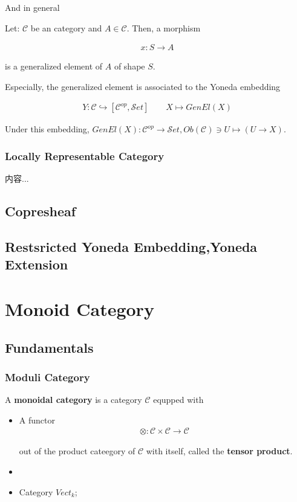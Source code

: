 \documentclass[Total.tex]{subfiles}
\begin{document}
		And in general
		
		\begin{Def}
			\label{Category-Theory-Generalized-Element}Let: $\mathcal{C}$ be an category and $A\in \mathcal{C}$. Then, a morphism
			
			\begin{gather*}
				x:S\rightarrow A
			\end{gather*}
			
			is a generalized element of $A$ of shape $S$.
		\end{Def}
		
		Especially, the generalized element is associated to the Yoneda embedding
		
		\begin{gather*}
			Y:\mathcal{C}\hookrightarrow [\mathcal{C}^{op},{\mathcal Set}]\qquad X\mapsto GenEl(X)
		\end{gather*}
		
		Under this embedding, $GenEl(X):\mathcal{C}^{op}\rightarrow {\mathcal Set}, Ob(\mathcal{C})\ni U\mapsto (U\rightarrow X)$. 
		
		\subsection{Locally Representable Category}
		\begin{Def}
			内容...
		\end{Def}
		\section{Copresheaf}
		\section{Restsricted Yoneda Embedding,Yoneda Extension}
	\chapter{Monoid Category}
		\section{Fundamentals}
			\subsection{Moduli Category}
				\begin{Def}
					A \textbf{monoidal category} is a category $\mathcal{C}$ equpped with
					\begin{itemize}
						\item A functor
						\begin{gather*}
							\otimes: \mathcal{C}\times \mathcal{C}\rightarrow \mathcal{C}
						\end{gather*}
						
						out of the product cateegory of $\mathcal{C}$ with itself, called the \textbf{tensor product}.
						\item 
					\end{itemize}
				\end{Def}
				
				\begin{example}
					\begin{itemize}
						\item Category $Vect_k$;
					\end{itemize}
				\end{example}
\end{document}
